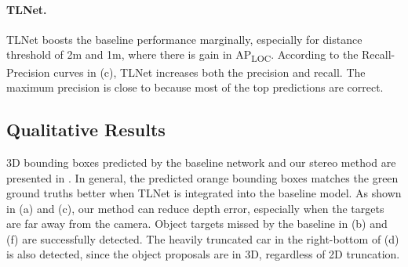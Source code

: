 \paragraph{TLNet.} TLNet boosts the baseline performance marginally, especially for distance threshold of 2m and 1m, where there is  gain in AP\textsubscript{LOC}. According to the Recall-Precision curves in \fig{\ref{fig:apcurves}} (c), TLNet increases both the precision and recall. The maximum precision is close to  because most of the top predictions are correct.

\subsection{Qualitative Results}
3D bounding boxes predicted by the baseline network and our stereo method are presented in \fig{\ref{fig:visualize3d}}. In general, the predicted orange bounding boxes matches the green ground truths better when TLNet is integrated into the baseline model. As shown in (a) and (c), our method can reduce depth error, especially when the targets are far away from the camera. Object targets missed by the baseline in (b) and (f) are successfully detected. The heavily truncated car in the right-bottom of (d) is also detected, since the object proposals are in 3D, regardless of 2D truncation.






